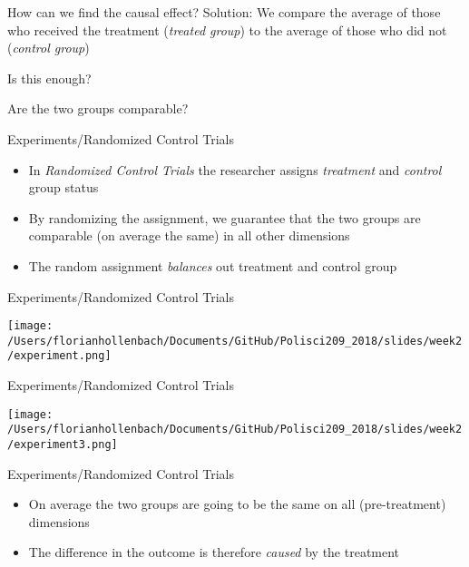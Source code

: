 \documentclass[presentation]{beamer}
\begin{document}
\begin{frame}[label={sec:orge4d7524}]{How can we find the causal effect?}
Solution: We compare the average of those who received the treatment (\emph{treated group}) to the average of those who did not (\emph{control group})
\pause


Is this enough?

\pause
Are the two groups comparable?
\end{frame}


\begin{frame}[label={sec:org1fe48df}]{Experiments/Randomized Control Trials}
\begin{itemize}
\item In \emph{Randomized Control Trials} the researcher assigns \emph{treatment} and \emph{control} group status
\end{itemize}
\pause
\begin{itemize}
\item By randomizing the assignment, we guarantee that the two groups are comparable (on average the same) in all other dimensions
\item The random assignment \emph{balances} out treatment and control group
\end{itemize}
\end{frame}

\begin{frame}[label={sec:org996c645}]{Experiments/Randomized Control Trials}
\begin{center}
\texttt{[image: /Users/florianhollenbach/Documents/GitHub/Polisci209\_2018/slides/week2/experiment.png]}
\end{center}
\end{frame}


\begin{frame}[label={sec:org5a51ae9}]{Experiments/Randomized Control Trials}
\begin{center}
\texttt{[image: /Users/florianhollenbach/Documents/GitHub/Polisci209\_2018/slides/week2/experiment3.png]}
\end{center}
\end{frame}

\begin{frame}[label={sec:org53343d4}]{Experiments/Randomized Control Trials}
\begin{itemize}
\item On average the two groups are going to be the same on all (pre-treatment) dimensions
\item The difference in the outcome is therefore \emph{caused} by the treatment
\end{itemize}
\end{frame}
\end{document}
